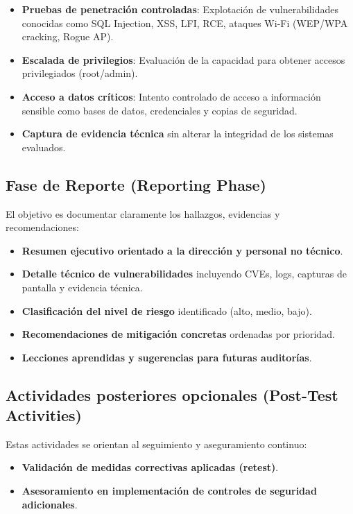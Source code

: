 \documentclass[a4paper, 10pt]{article}
\begin{document}
\begin{itemize}
\item \textbf{Pruebas de penetración controladas}: Explotación de vulnerabilidades conocidas como SQL Injection, XSS, LFI, RCE, ataques Wi-Fi (WEP/WPA cracking, Rogue AP).
\item \textbf{Escalada de privilegios}: Evaluación de la capacidad para obtener accesos privilegiados (root/admin).
\item \textbf{Acceso a datos críticos}: Intento controlado de acceso a información sensible como bases de datos, credenciales y copias de seguridad.
\item \textbf{Captura de evidencia técnica} sin alterar la integridad de los sistemas evaluados.
\end{itemize}

\subsection{Fase de Reporte (Reporting Phase)}

El objetivo es documentar claramente los hallazgos, evidencias y recomendaciones:

\begin{itemize}
\item \textbf{Resumen ejecutivo orientado a la dirección y personal no técnico}.
\item \textbf{Detalle técnico de vulnerabilidades} incluyendo CVEs, logs, capturas de pantalla y evidencia técnica.
\item \textbf{Clasificación del nivel de riesgo} identificado (alto, medio, bajo).
\item \textbf{Recomendaciones de mitigación concretas} ordenadas por prioridad.
\item \textbf{Lecciones aprendidas y sugerencias para futuras auditorías}.
\end{itemize}

\subsection{Actividades posteriores opcionales (Post-Test Activities)}

Estas actividades se orientan al seguimiento y aseguramiento continuo:

\begin{itemize}
\item \textbf{Validación de medidas correctivas aplicadas (retest)}.
\item \textbf{Asesoramiento en implementación de controles de seguridad adicionales}.
\end{itemize}
\end{document}
